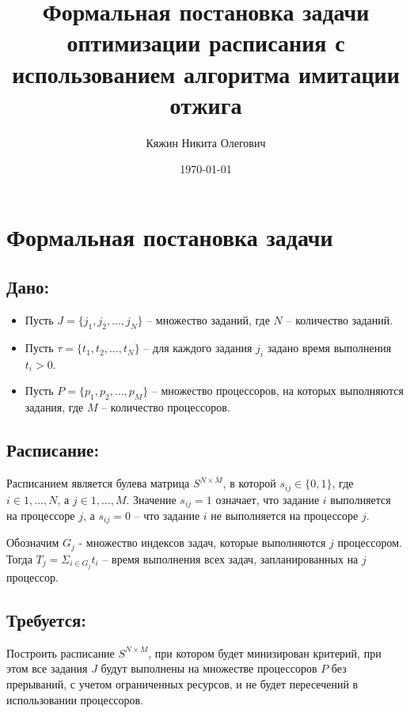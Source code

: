 \documentclass{article}
\begin{document}
    \title{\textbf{Формальная постановка задачи оптимизации расписания с использованием алгоритма имитации отжига}}
    \author{Кяжин Никита Олегович}
    \date{\today}
    \maketitle

    \newpage
    \pagestyle{fancy}
    \fancyhf{}
    \rhead{\thepage}

    \section*{Формальная постановка задачи}
        
        \subsection*{Дано:}
            \begin{itemize}
                \item Пусть $J = \{j_1, j_2, \dots, j_N\}$ -- множество заданий, где $N$ -- количество заданий.
                \item Пусть $\tau  = \{t_1, t_2, \dots, t_N\}$ -- для каждого задания $j_i$ задано время выполнения $t_i > 0$.
                \item Пусть $P = \{p_1, p_2, \dots, p_M\}$ -- множество процессоров, на которых выполняются задания, где $M$ -- количество процессоров.
            \end{itemize}
        
        \subsection*{Расписание:}
            Расписанием является булева матрица $S^{N \times M}$, в которой $s_{ij} \in \{0, 1\}$, где $i \in {1, \dots, N}$, а $j \in {1, \dots, M}$. Значение $s_{ij} = 1$ означает,
            что задание $i$ выполняется на процессоре $j$, а $s_{ij} = 0$ -- что задание $i$ не выполняется на процессоре $j$.
            
            Обозначим $G_j$ - множество индексов задач, которые выполняются $j$ процессором. Тогда 
            $T_j = \Sigma_{i \in G_j}t_i$ -- время выполнения всех задач, запланированных на $j$ процессор.

        \subsection*{Требуется:}
            Построить расписание $S^{N \times M}$, при котором будет минизирован критерий, при этом все задания $J$ будут выполнены на множестве процессоров $P$ без прерываний,
            с учетом ограниченных ресурсов, и не будет пересечений в использовании процессоров.
\end{document}
